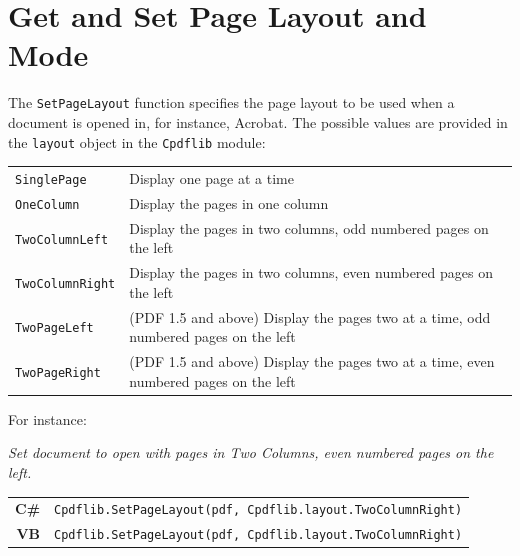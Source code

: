 \documentclass[a4paper]{memoir}
\begin{document}
\section{Get and Set Page Layout and Mode}
The \verb!SetPageLayout! function specifies the page layout to be used
when a document is opened in, for instance, Acrobat. The possible
values are provided in the \verb!layout! object in the \verb!Cpdflib! module:

\begin{framed}
  \begin{tabular}{ll}
    \texttt{SinglePage} & \vspace{2mm} \parbox{8cm}{Display one page at a time} \\
    \texttt{OneColumn} & \vspace{2mm} \parbox{8cm}{Display the pages in one column} \\
    \texttt{TwoColumnLeft} & \vspace{2mm} \parbox{8cm}{Display the pages in two columns, odd numbered pages on the left} \\
    \texttt{TwoColumnRight} & \vspace{2mm} \parbox{8cm}{Display the pages in two columns, even numbered pages on the left} \\
    \texttt{TwoPageLeft} & \vspace{2mm} \parbox{8cm}{(PDF 1.5 and above) Display the pages two at a time, odd numbered pages on the left} \\
    \texttt{TwoPageRight} & \vspace{2mm} \parbox{8cm}{(PDF 1.5 and above) Display the pages two at a time, even numbered pages on the left}
  \end{tabular}
\end{framed}

For instance:

\begin{framed}
\noindent\textit{Set document to open with pages in Two Columns, even numbered pages on the left.}

\vspace{2mm}
\noindent\begin{tabular}{rl}
\small\sffamily\textbf{C\#} &
\begin{minipage}{4in}
\small\verb!Cpdflib.SetPageLayout(pdf, Cpdflib.layout.TwoColumnRight)!
\end{minipage}\\[5mm]
\small\sffamily\textbf{VB} &
\begin{minipage}{4in}
\small\verb!Cpdflib.SetPageLayout(pdf, Cpdflib.layout.TwoColumnRight)!
\end{minipage}\\[5mm]
\end{tabular}
\end{framed}
\end{document}
